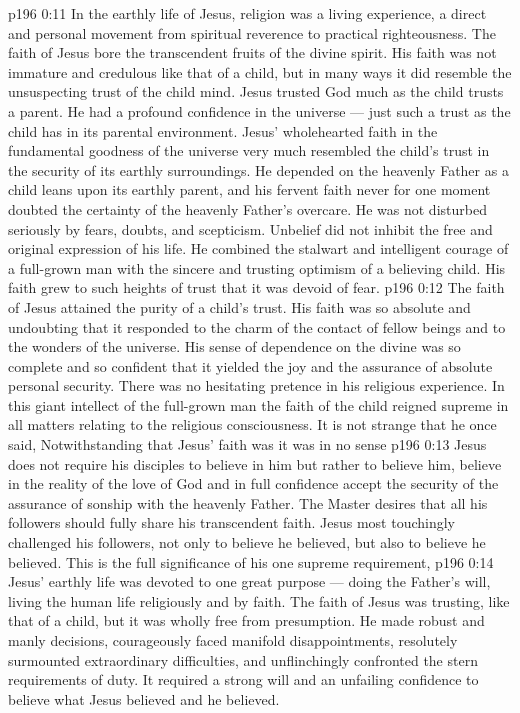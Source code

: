\vs p196 0:11 In the earthly life of Jesus, religion was a living experience, a direct and personal movement from spiritual reverence to practical righteousness. The faith of Jesus bore the transcendent fruits of the divine spirit. His faith was not immature and credulous like that of a child, but in many ways it did resemble the unsuspecting trust of the child mind. Jesus trusted God much as the child trusts a parent. He had a profound confidence in the universe --- just such a trust as the child has in its parental environment. Jesus’ wholehearted faith in the fundamental goodness of the universe very much resembled the child’s trust in the security of its earthly surroundings. He depended on the heavenly Father as a child leans upon its earthly parent, and his fervent faith never for one moment doubted the certainty of the heavenly Father’s overcare. He was not disturbed seriously by fears, doubts, and scepticism. Unbelief did not inhibit the free and original expression of his life. He combined the stalwart and intelligent courage of a full\hyp{}grown man with the sincere and trusting optimism of a believing child. His faith grew to such heights of trust that it was devoid of fear.
\vs p196 0:12 The faith of Jesus attained the purity of a child’s trust. His faith was so absolute and undoubting that it responded to the charm of the contact of fellow beings and to the wonders of the universe. His sense of dependence on the divine was so complete and so confident that it yielded the joy and the assurance of absolute personal security. There was no hesitating pretence in his religious experience. In this giant intellect of the full\hyp{}grown man the faith of the child reigned supreme in all matters relating to the religious consciousness. It is not strange that he once said,  Notwithstanding that Jesus’ faith was  it was in no sense 
\vs p196 0:13 Jesus does not require his disciples to believe in him but rather to believe  him, believe in the reality of the love of God and in full confidence accept the security of the assurance of sonship with the heavenly Father. The Master desires that all his followers should fully share his transcendent faith. Jesus most touchingly challenged his followers, not only to believe  he believed, but also to believe  he believed. This is the full significance of his one supreme requirement, 
\vs p196 0:14 Jesus’ earthly life was devoted to one great purpose --- doing the Father’s will, living the human life religiously and by faith. The faith of Jesus was trusting, like that of a child, but it was wholly free from presumption. He made robust and manly decisions, courageously faced manifold disappointments, resolutely surmounted extraordinary difficulties, and unflinchingly confronted the stern requirements of duty. It required a strong will and an unfailing confidence to believe what Jesus believed and  he believed.
